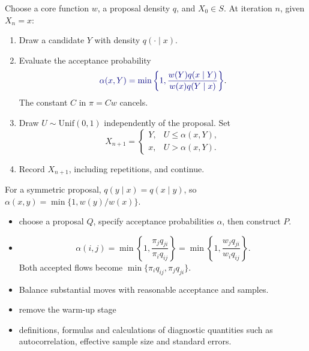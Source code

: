 \documentclass[8pt,a4paper,landscape]{extarticle}
\begin{document}
\begin{cscolumns}
\begin{algorithm}[Implementation]
Choose a core function $w$, a proposal density $q$, and $X_0\in S$. At iteration $n$, given $X_n=x$:
\begin{enumerate}
\item Draw a candidate $Y$ with density $q(\cdot\mid x)$.
\item Evaluate the acceptance probability
\[ {\color{csBlue}\alpha(x,Y)=\min\left\{1,\dfrac{w(Y)q(x\mid Y)}{w(x)q(Y\mid x)}\right\}}. \]
The constant $C$ in $\pi=Cw$ cancels.
\item Draw $U\sim\mathrm{Unif}(0,1)$ independently of the proposal. Set
\[ X_{n+1}=\begin{cases} Y, & U\le\alpha(x,Y),\\ x, & U>\alpha(x,Y). \end{cases} \]
\item Record $X_{n+1}$, including repetitions, and continue.
\end{enumerate}
For a symmetric proposal, $q(y\mid x)=q(x\mid y)$, so $\alpha(x,y)=\min\{1, w(y)/w(x)\}$.
\end{algorithm}

\columnbreak
{}
\begin{itemize}
\item {} choose a proposal $Q$, specify acceptance probabilities $\alpha$, then construct $P$.
\item {}
\[ \alpha(i,j)=\min\left\{1,\dfrac{\pi_j q_{ji}}{\pi_i q_{ij}}\right\}=\min\left\{1,\dfrac{w_j q_{ji}}{w_i q_{ij}}\right\}. \]
Both accepted flows become $\min\{\pi_i q_{ij},\pi_j q_{ji}\}$.
\item {} Balance substantial moves with reasonable acceptance and samples.
\item {} remove the warm-up stage
\item {} definitions, formulas and calculations of diagnostic quantities such as autocorrelation, effective sample size and standard errors.
\end{itemize}



\end{cscolumns}
\end{document}
